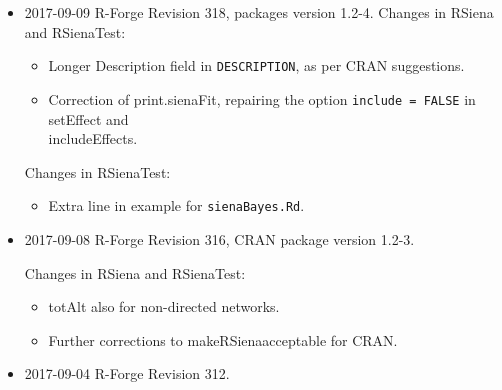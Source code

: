 \documentclass[a4paper,fleqn,11pt]{article}
\newcommand{\+}{\, + \,}
\newcommand{\sfn}[1]{\textsf{#1}}
\begin{document}
\begin{small}
\begin{itemize}
\item 2017-09-09 R-Forge Revision 318, packages version 1.2-4.
Changes in \textsf{RSiena} and \textsf{RSienaTest}:
\begin{itemize}
   \item Longer Description field in \texttt{DESCRIPTION}, as per CRAN suggestions.
   \item Correction of \sfn{print.sienaFit}, repairing the option
        \texttt{include = FALSE}  in \textsf{setEffect} and \\
        \sfn{includeEffects}.
\end{itemize}
Changes in \textsf{RSienaTest}:
\begin{itemize}
   \item Extra line in example for \texttt{sienaBayes.Rd}.
\end{itemize}

\item 2017-09-08 R-Forge Revision 316, CRAN package version 1.2-3.

Changes in \textsf{RSiena} and \textsf{RSienaTest}:
\begin{itemize}
 \item totAlt also for non-directed networks.
 \item Further corrections to make\textsf{RSiena}acceptable for CRAN.
\end{itemize}

\item 2017-09-04 R-Forge Revision 312.


\end{itemize}
\end{small}
\end{document}
